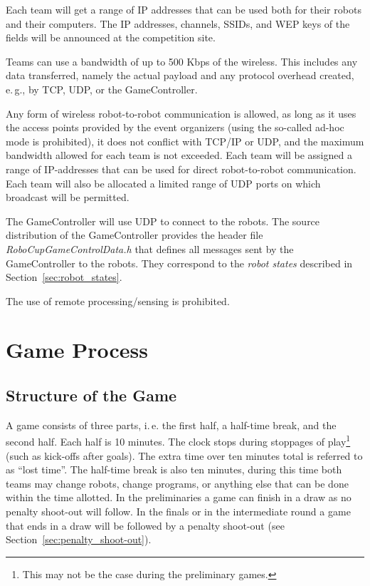 \documentclass[12pt]{article}
\newcommand{\ie}{\mbox{i.\,e.}\xspace}
\newcommand{\eg}{\mbox{e.\,g.}\xspace}
\begin{document}
Each team will get a range of IP addresses that can be used both for their robots and their computers. The IP addresses, channels, SSIDs, and WEP keys of the fields will be announced at the competition site.

Teams can use a bandwidth of up to 500 Kbps of the wireless. This includes any data transferred, namely the actual payload and any protocol overhead created, \eg, by TCP, UDP, or the GameController.

Any form of wireless robot-to-robot communication is allowed, as long as it uses the access points provided by the event organizers (using the so-called ad-hoc mode is prohibited), it does not conflict with TCP/IP or UDP, and the maximum bandwidth allowed for each team is not exceeded. Each team will be assigned a range of IP-addresses that can be used for direct robot-to-robot communication. Each team will also be allocated a limited range of UDP ports on which broadcast will be permitted.

The GameController will use UDP to connect to the robots. The source distribution of the GameController provides the header file \emph{RoboCupGameControlData.h} that defines all messages sent by the GameController to the robots. They correspond to the \emph{robot states} described in Section~\ref{sec:robot_states}.

The use of remote processing/sensing is prohibited.

\section{Game Process}

\subsection{Structure of the Game}
\label{sec:game_struct}

A game consists of three parts, \ie the first half, a half-time break, and the second half. Each half is 10 minutes. The clock stops during stoppages of play\footnote{This may not be the case during the preliminary games.} (such as kick-offs after goals). The extra time over ten minutes total is referred to as ``lost time''. The half-time break is also ten minutes, during this time both teams may change robots, change programs, or anything else that can be done within the time allotted. In the preliminaries a game can finish in a draw as no penalty shoot-out will follow. In the finals or in the intermediate round a game that ends in a draw will be followed by a penalty shoot-out (see Section~\ref{sec:penalty_shoot-out}).
\end{document}

